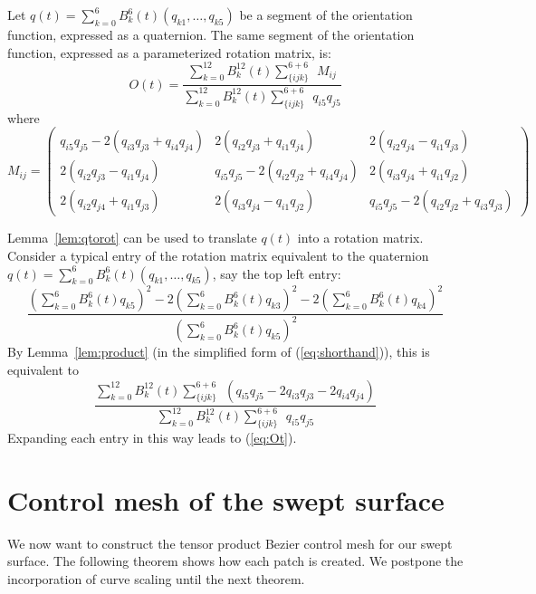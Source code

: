 \begin{lemma}
\label{lem:Mij}
Let $q(t) = \sum_{k=0}^6 B_k^6(t) (q_{k1},\ldots,q_{k5})$
be a segment of the orientation function, expressed as a quaternion.
The same segment of the orientation function, expressed as a parameterized
rotation matrix, is:
\begin{equation}
\label{eq:Ot}
O(t) = \frac{\sum_{k=0}^{12} B_k^{12}(t) \sum_{\{ijk\}}^{6+6}\ \ M_{ij}}
	    {\sum_{k=0}^{12} B_k^{12}(t) \sum_{\{ijk\}}^{6+6} \ \ q_{i5}q_{j5}}
\end{equation}
where
\[
	M_{ij} = \left( \begin{array}{ccc}
	q_{i5}q_{j5} - 2(q_{i3}q_{j3} + q_{i4}q_{j4}) &
	2(q_{i2}q_{j3} + q_{i1}q_{j4}) &
	2(q_{i2}q_{j4} - q_{i1}q_{j3}) \\
	2(q_{i2}q_{j3} - q_{i1}q_{j4}) &
	q_{i5}q_{j5} - 2(q_{i2}q_{j2} + q_{i4}q_{j4}) &
	2(q_{i3}q_{j4} + q_{i1}q_{j2}) \\
	2(q_{i2}q_{j4} + q_{i1}q_{j3}) &
	2(q_{i3}q_{j4} - q_{i1}q_{j2}) &
	q_{i5}q_{j5} - 2(q_{i2}q_{j2} + q_{i3}q_{j3}) 
	\end{array} \right)
\]
\end{lemma}
\prf
Lemma~\ref{lem:qtorot} can be used to translate $q(t)$ 
into a rotation matrix.
Consider a typical entry of the rotation matrix equivalent 
to the quaternion $q(t) = \sum_{k=0}^6 B_k^6(t) (q_{k1},\ldots,q_{k5})$,
say the top left entry:
\[
\frac{	(\sum_{k=0}^6 B_k^6(t) q_{k5})^2 - 
	2(\sum_{k=0}^6 B_k^6(t) q_{k3})^2 - 2(\sum_{k=0}^6 B_k^6(t) q_{k4})^2}
     {  (\sum_{k=0}^6 B_k^6(t) q_{k5})^2 }
\]
By Lemma~\ref{lem:product} (in the simplified form of (\ref{eq:shorthand})), 
this is equivalent to
\[
\frac{	\sum_{k=0}^{12} B_k^{12}(t) \sum_{\{ijk\}}^{6+6}
	\ \ (q_{i5} q_{j5} - 2q_{i3}q_{j3} - 2q_{i4}q_{j4}) }
     {  \sum_{k=0}^{12} B_k^{12}(t) \sum_{\{ijk\}}^{6+6} \ \ q_{i5} q_{j5}} 
\]
Expanding each entry in this way leads to (\ref{eq:Ot}).
\QED

\section{Control mesh of the swept surface}
\label{sec:mesh}

We now want to construct the tensor product Bezier control mesh 
for our swept surface.
The following theorem shows how each patch is created.
We postpone the incorporation of curve scaling until the next theorem.

